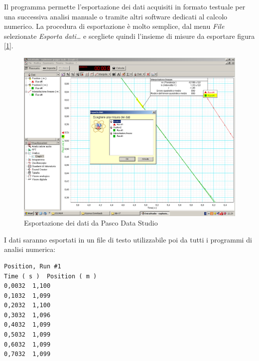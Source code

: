 \documentclass[a4paper,10pt,oneside]{article}
\begin{document}
Il programma permette l'esportazione dei dati acquisiti  in formato testuale per una successiva analisi manuale o tramite altri software dedicati al calcolo numerico. La procedura di esportazione è molto semplice, dal menu \textsl{File} selezionate \textsl{Esporta dati\ldots} e scegliete quindi l'insieme di misure da esportare figura [\ref{fig:pasco_export}].
\begin{figure}
 \centering
 \includegraphics[width=\textwidth]{./pasco3.png}
 \caption{Esportazione dei dati da Pasco Data Studio}
 \label{fig:pasco_export}
\end{figure}

I dati saranno esportati in un file di testo utilizzabile poi da tutti i programmi di analisi numerica:
\begin{verbatim}
Position, Run #1
Time ( s )	Position ( m )
0,0032	1,100
0,1032	1,099
0,2032	1,100
0,3032	1,096
0,4032	1,099
0,5032	1,099
0,6032	1,099
0,7032	1,099
\end{verbatim}
\end{document}
